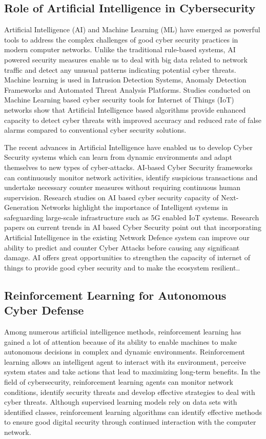 \documentclass[12pt]{article}
\begin{document}
\subsection{Role of Artificial Intelligence in Cybersecurity}
Artificial Intelligence (AI) and Machine Learning (ML) have emerged as powerful tools to address the complex challenges of good cyber security practices in modern computer networks. Unlike the traditional rule-based systems, AI powered security measures enable us to deal with big data related to network traffic and detect any unusual patterns indicating potential cyber threats. Machine learning is used in Intrusion Detection Systems, Anomaly Detection Frameworks and Automated Threat Analysis Platforms. Studies conducted on Machine Learning based cyber security tools for Internet of Things (IoT) networks show that Artificial Intelligence based algorithms provide enhanced capacity to detect cyber threats with improved accuracy and reduced rate of false alarms compared to conventional cyber security solutions.

The recent advances in Artificial Intelligence have enabled us to develop Cyber Security systems which can learn from dynamic environments and adapt themselves to new types of cyber-attacks. AI-based Cyber Security frameworks can continuously monitor network activities, identify suspicious transactions and undertake necessary counter measures without requiring continuous human supervision. Research studies on AI based cyber security capacity of Next-Generation Networks highlight the importance of Intelligent systems in safeguarding large-scale infrastructure such as 5G enabled IoT systems. Research papers on current trends in AI based Cyber Security point out that incorporating Artificial Intelligence in the existing Network Defence system can improve our ability to predict and counter Cyber Attacks before causing any significant damage. AI offers great opportunities to strengthen the capacity of internet of things to provide good cyber security and to make the ecosystem resilient.\cite{Khan2023, Alnfiai2025}.
\subsection{Reinforcement Learning for Autonomous Cyber Defense}
Among numerous artificial intelligence methods, reinforcement learning has gained a lot of attention because of its ability to enable machines to make autonomous decisions in complex and dynamic environments. Reinforcement learning allows an intelligent agent to interact with its environment, perceive system states and take actions that lead to maximizing long-term benefits. In the field of cybersecurity, reinforcement learning agents can monitor network conditions, identify security threats and develop effective strategies to deal with cyber threats. Although supervised learning models rely on data sets with identified classes, reinforcement learning algorithms can identify effective methods to ensure good digital security through continued interaction with the computer network.
\end{document}
